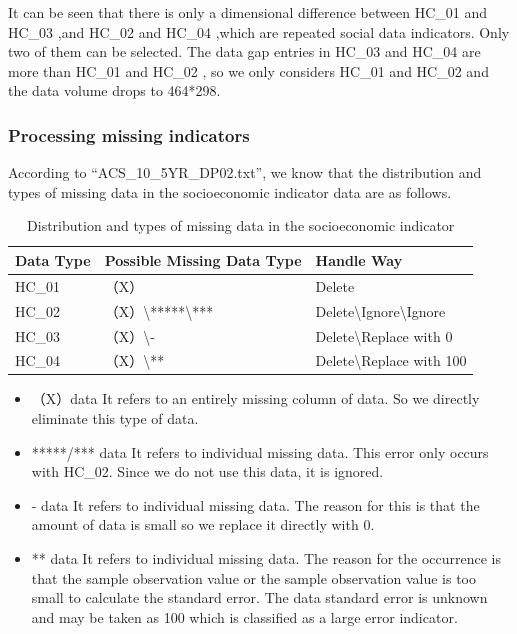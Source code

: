 \documentclass{mcmthesis}
\begin{document}
It can be seen that there is only a dimensional difference between HC\_01 and HC\_03 ,and HC\_02 and HC\_04 ,which are repeated social data indicators. Only two of them can be selected. The data gap entries in HC\_03 and HC\_04 are more than HC\_01 and HC\_02 , so we only considers HC\_01 and HC\_02 and the data volume drops to 464*298.

\subsubsection{Processing missing indicators}

According to “ACS\_10\_5YR\_DP02.txt”, we know that the distribution and types of missing data in the socioeconomic indicator data are as follows.
\begin{table}[htbp]
  \centering
  \caption{Distribution and types of missing data in the socioeconomic indicator}
    \begin{tabular}{p{5em}p{13.915em}p{11.835em}}
    \toprule
    Data Type & Possible Missing Data Type & Handle Way \\
    \midrule
    HC\_01 & （X） & Delete \\
    HC\_02 & （X）\textbackslash{}*****\textbackslash{}*** & Delete\textbackslash{}Ignore\textbackslash{}Ignore \\
    HC\_03 & （X）\textbackslash{}- & Delete\textbackslash{}Replace with 0 \\
    HC\_04 & （X）\textbackslash{}** & Delete\textbackslash{}Replace with 100 \\
    \bottomrule
    \end{tabular}%
  \label{tab:addlabel}%
\end{table}%


\begin{itemize}
  \item （X）data
It refers to an entirely missing column of data. So we directly eliminate this type of data.

\item *****/*** data
It refers to individual missing data. This error only occurs with HC\_02. Since we do not use this data, it is ignored.

\item - data
It refers to individual missing data. The reason for this is that the amount of data is small so we replace it directly with 0.

\item ** data
It refers to individual missing data. The reason for the occurrence is that the sample observation value or the sample observation value is too small to calculate the standard error. The data standard error is unknown and may be taken as 100 which is classified as a large error indicator.
\end{itemize}
\end{document}
